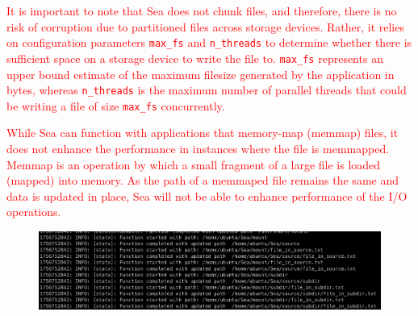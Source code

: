 \documentclass[pdflatex,sn-mathphys-num]{sn-jnl}
\newcommand{\vhs}[1]{\textcolor{red}{#1}}
\theoremstyle{thmstyleone}%
\theoremstyle{thmstyletwo}%
\theoremstyle{thmstylethree}%
\begin{document}
    \vhs{It is important to note that Sea does not chunk files, and therefore, there is no risk of corruption due to partitioned files across storage devices. Rather, it relies on configuration parameters
    \texttt{max\_fs} and \texttt{n\_threads} to determine whether there is sufficient space on a storage device to write the file to. \texttt{max\_fs} represents an upper bound estimate of the maximum
    filesize generated by the application in bytes, whereas \texttt{n\_threads} is the maximum number of parallel threads that could be writing a file of size \texttt{max\_fs} concurrently. }

    \vhs{While Sea can function with applications that memory-map (memmap) files, it does not enhance the performance in instances where the file is memmapped. Memmap is an operation by which a small fragment of a large file is loaded (mapped) into memory. As the path of a memmaped file remains the same and data is updated in place, Sea will not be able to enhance performance of the I/O operations. }

    \begin{figure}
      \centering
      \includegraphics[width=\textwidth]{figures/ex_log.png}
       \captionsetup{justification=centering}
    \label{fig:seaneuro:logs}
    \end{figure}
\end{document}
